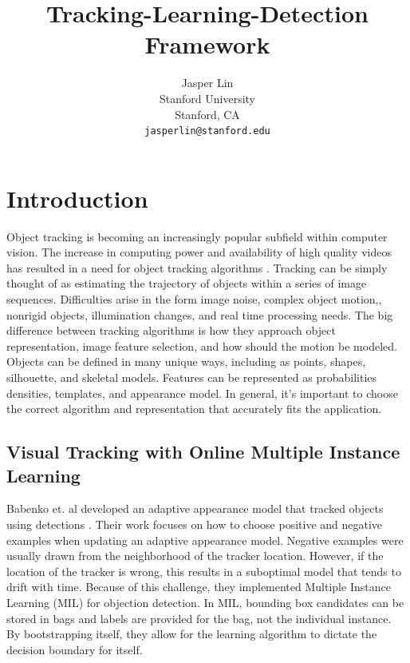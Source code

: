 \documentclass[10pt,twocolumn,letterpaper]{article}
\begin{document}
\title{Tracking-Learning-Detection Framework}

\author{Jasper Lin\\
Stanford University\\
Stanford, CA \\
{\tt\small jasperlin@stanford.edu}}
\maketitle


\section{Introduction}
Object tracking is becoming an increasingly popular subfield within computer vision.  The increase in computing power and availability of high quality videos has resulted in a need for object tracking algorithms \cite{survey}. Tracking can be simply thought of as estimating the trajectory of objects within a series of image sequences. Difficulties arise in the form image noise, complex object motion,, nonrigid objects, illumination changes, and real time processing needs. The big difference between tracking algorithms is how they approach object representation, image feature selection, and how should the motion be modeled. Objects can be defined in many unique ways, including as points, shapes, silhouette, and skeletal models. Features can be represented as probabilities densities, templates, and appearance model. In general, it's important to choose the correct algorithm and representation that accurately fits the application. 

\subsection{Visual Tracking with Online Multiple Instance Learning}
	Babenko et. al developed an adaptive appearance model that tracked objects using detections \cite{MIL}. Their work focuses on how to choose positive and negative examples when updating an adaptive appearance model. Negative examples were usually drawn from the neighborhood of the tracker location. However, if the location of the tracker is wrong, this results in a suboptimal model that tends to drift with time. Because of this challenge, they implemented Multiple Instance Learning (MIL) for objection detection. In MIL, bounding box candidates can be stored in bags and labels are provided for the bag, not the individual instance. By bootstrapping itself, they allow for the learning algorithm to dictate the decision boundary for itself.
\end{document}

